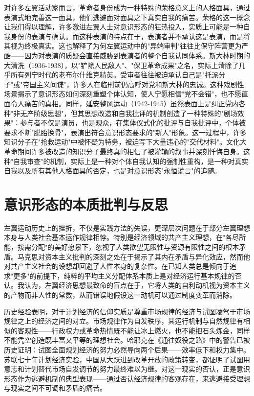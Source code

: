 \documentclass{article}
\begin{document}
对许多左翼活动家而言，革命者身份成为一种特殊的荣格意义上的人格面具，通过表演式地完善这一面具，他们逃避面对面具之下真实自我的痛苦。荣格的这一概念让我们得以理解，许多激进左翼人士对意识形态的狂热投入，实质上可能是一种自我身份的表演与确认。而这种表演的特点在于，表演者并不承认这是表演，而是将其视为终极真实。这也解释了为何左翼运动中的"异端审判"往往比保守阵营更为严酷——因为对表演的质疑会直接威胁到表演者的整个自我认同体系。斯大林时期的大清洗（1936-1938），以"铲除人民敌人"、"保卫革命成果"之名，实际上清除了几乎所有列宁时代的老布尔什维克精英。受审者往往被迫承认自己是"托派分子"或"帝国主义间谍"，许多人在临刑前仍高呼对党和斯大林的忠诚。这种戏剧性场景揭示了意识形态如何深刻重塑个体认知，使人宁愿相信"党不会错"，也不愿直面令人痛苦的真相。同样，延安整风运动（1942-1945）虽然表面上是纠正党内各种"非无产阶级思想"，但其思想改造和自我批评的机制创造了一种特殊的"剧场效果"：参与者不仅是演员，也是观众，在集体仪式化的批评与自我批评中，个体被要求不断"脱胎换骨"，表演出符合意识形态要求的"新人"形象。这一过程中，许多知识分子在"抢救运动"中被怀疑为特务，被迫写下大量违心的"交代材料"。文化大革命期间许多被改造的知识分子最终真的相信了被灌输的叙事并深刻忏悔自身。这种"自我审查"的机制，实际上是一种对个体自我认知的强制性重构，是一种对真实自我以及所有其他人格面具的否定，也是对意识形态"永恒谎言"的追随。

\section{意识形态的本质批判与反思}

左翼运动历史上的挫折，不仅是实践方法的失误，更深层次问题在于部分左翼理想本身与人类社会基本运作规律相悖。特别是经济领域的共产主义理想，在"各尽所能，按需分配"的美好愿景下，忽视了人类欲望无限性与资源有限性之间的根本矛盾。马克思对资本主义批判的深刻之处在于揭示了其内在矛盾与异化效应，然而他对共产主义社会的设想却回避了人性本身的复杂性。在已知人类总是倾向于追求"更多"的前提下，纯粹的平均主义分配体系本质上是对经济运行基本规律的否认。我认为，左翼经济思想最致命的盲点在于，它将人类的自利动机视为资本主义的产物而非人性的常数，从而错误地假设这一动机可以通过制度变革而消除。

历史经验表明，对于计划经济的信仰实质是尊重市场规律的经济与试图凌驾于市场规律之上的经济之间的对立。市场规律作为自发秩序，其运行机制与自然规律有相似的客观性——行政权力或革命热情既不能让冰上燃火，也不能把石头炼金，同样不能凭空创造既丰富又平等的理想社会。哈耶克在《通往奴役之路》中的警告已被历史证明：试图全面规划经济的努力必然导向两个后果——效率低下和权力集中。苏联七十年计划经济实验，中国从大跃进到改革开放的政策转变，都证明了试图用意志和计划替代市场自发调节的努力最终难以为继。对这一现实的否认，正是意识形态作为逃避机制的典型表现——通过否认经济规律的客观存在，来逃避接受理想与现实之间不可调和矛盾的痛苦。
\end{document}
